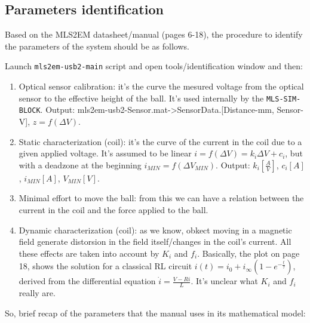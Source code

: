 \subsection{Parameters identification}
\label{subsec:parameters_identification}

Based on the MLS2EM datasheet/manual (pages 6-18), the procedure to identify the parameters of the system should be as follows.

Launch \texttt{mls2em-usb2-main} script and open tools/identification window and then:

\begin{enumerate}
    \item Optical sensor calibration: it's the curve the mesured voltage from the optical sensor to the effective height of the ball. It's used internally by the \texttt{MLS-SIM-BLOCK}. Output: mls2em-usb2-Sensor.mat->SensorData.[Distance-mm, Sensor-V], $z = f(\Delta V)$.
    \item Static characterization (coil): it's the curve of the current in the coil due to a given applied voltage. It's assumed to be linear $i = f(\Delta V) = k_i \Delta V  + c_i$, but with a deadzone at the beginning $i_{MIN} = f(\Delta V_{MIN})$. Output: $k_i [\frac{A}{V}]$, $c_i [A]$, $i_{MIN} [A]$, $V_{MIN} [V]$.
    \item Minimal effort to move the ball: from this we can have a relation between the current in the coil and the force applied to the ball.
    \item Dynamic characterization (coil): as we know, obkect moving in a magnetic field generate distorsion in the field itself/changes in the coil's current. All these effects are taken into account by $K_i$ and $f_i$. Basically, the plot on page 18, shows the solution for a classical RL circuit $i(t) = i_0 + i_{\infty} (1 - e^{-\frac{t}{\tau}})$, derived from the differential equation $\dot{i} = \frac{V - R i}{L}$. It's unclear what $K_i$ and $f_i$ really are.
\end{enumerate}


So, brief recap of the parameters that the manual uses in its mathematical model:

